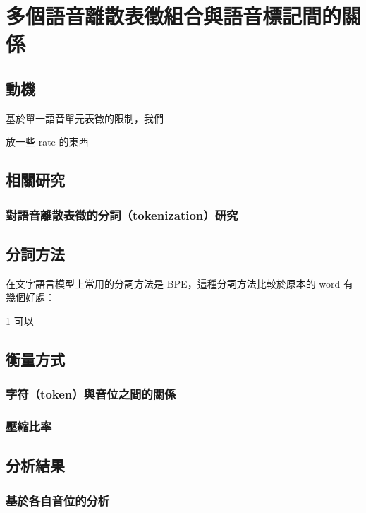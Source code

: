 
\chapter{多個語音離散表徵組合與語音標記間的關係}

\section{動機}

基於單一語音單元表徵的限制，我們

放一些 rate 的東西



\section{相關研究}

\subsection{對語音離散表徵的分詞（tokenization）研究}



\section{分詞方法}

在文字語言模型上常用的分詞方法是 BPE，這種分詞方法比較於原本的 word 有幾個好處：

1 可以



\section{衡量方式}

\subsection{字符（token）與音位之間的關係}

\subsection{壓縮比率}


\section{分析結果}

\subsection{基於各自音位的分析}

